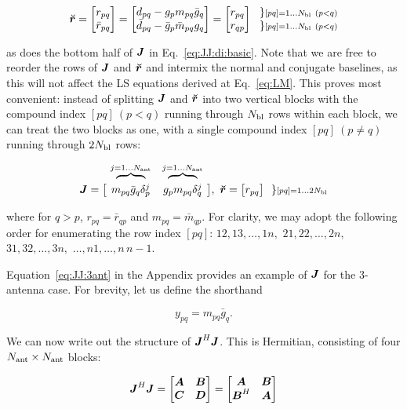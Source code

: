 \documentclass[useAMS,usenatbib]{mn2e}
\newcommand{\mat}[1]{{\bmath{#1}}}
\newcommand{\JJ}{\mat{J}} %
\begin{document}
\[
\Rr = \Matrix{c}{ r_{pq} \\ \bar{r}_{pq} } = \Matrix{c}{d_{pq}-g_p m_{pq}\bar{g}_q\\ \bar{d}_{pq}-\bar{g}_p \bar{m}_{pq}g_q} = 
\Matrix{c}{ r_{pq} \\ r_{qp} }~~ 
\Stack{ \} \scriptstyle [pq]=1\dots \Nbl~(p<q) \\ \} \scriptstyle [pq]=1\dots \Nbl~(p<q) }
\]

as does the bottom half of $\JJ$ in Eq.~\ref{eq:JJ:di:basic}. Note that we are free to reorder the rows of $\JJ$ and $\Rr$ 
and intermix the normal and conjugate baselines, as this will not affect the LS equations derived at Eq.~\ref{eq:LM}.
This proves most convenient: instead of splitting $\JJ$ and $\Rr$ into 
two vertical blocks with the compound index $[pq]~(p<q)$ running through $N_\mathrm{bl}$ rows within each block, we can treat 
the two blocks as one, with a single compound index $[pq]~(p\ne q)$ running through $2N_\mathrm{bl}$ rows:

\begin{equation}
\label{eq:JJ:di}
\begin{array}{r@{~}cc@{~}cc}
                & \overbrace{~~~~~~~~}^{j=1\dots \Na} & \overbrace{~~~~~~~~}^{j=1\dots \Na} \\
\JJ = \big [ & m_{pq}\bar{g}_q\delta^{j}_p & g_p m_{pq} \delta^{j}_q & \big ],~
\Rr = \big [ r_{pq} \big ] ~~{\} \scriptstyle [pq]=1\dots 2\Nbl}
\end{array}
\end{equation}

where for $q>p$, $r_{pq}=\bar{r}_{qp}$ and $m_{pq}=\bar{m}_{qp}$. For clarity, we may adopt the 
following order for enumerating the row index $[pq]$: $12,13,\dots,1n,$ $21,22,\dots,2n,$ $31,32,\dots,3n,$ $\dots,n1,\dots,n\,n-1$. 

Equation~\ref{eq:JJ:3ant} in the Appendix provides an example of $\JJ$ for the 3-antenna case. For
brevity, let us define the shorthand 

\[
y_{pq} = m_{pq} \bar{g}_q. 
\]

We can now write out the 
structure of $\JJ^H\JJ$. This is Hermitian, consisting of four $N_\mathrm{ant}\times N_\mathrm{ant}$ blocks:

\begin{equation}
\label{eq:JHJ:DI:ABCD}
\JJ^H\JJ = \Matrix{cc}{\mat{A}&\mat{B}\\\mat{C}&\mat{D}} = \Matrix{cc}{\mat{A}&\mat{B}\\\mat{B}^H&\mat{A}}
\end{equation}
\end{document}
